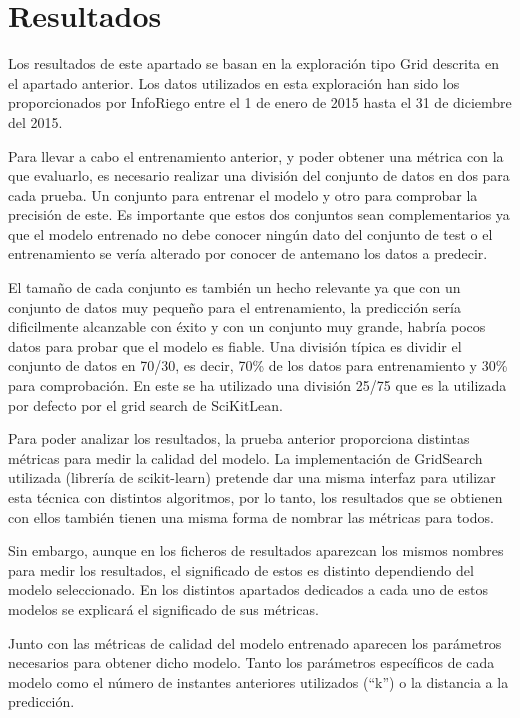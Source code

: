 \cleardoublepage

\chapter{Resultados}
\label{makereference7}

Los resultados de este apartado se basan en la exploración tipo Grid descrita en el apartado anterior. Los datos utilizados en esta exploración han sido los proporcionados por InfoRiego entre el 1 de enero de 2015 hasta el 31 de diciembre del 2015.

Para llevar a cabo el entrenamiento anterior, y poder obtener una métrica con la que evaluarlo, es necesario realizar una división del conjunto de datos en dos para cada prueba. Un conjunto para entrenar el modelo y otro para comprobar la precisión de este. Es importante que estos dos conjuntos sean complementarios ya que el modelo entrenado no debe conocer ningún dato del conjunto de test o el entrenamiento se vería alterado por conocer de antemano los datos a predecir.

El tamaño de cada conjunto es también un hecho relevante ya que con un conjunto de datos muy pequeño para el entrenamiento, la predicción sería dificilmente alcanzable con éxito y con un conjunto muy grande, habría pocos datos para probar que el modelo es fiable. Una división típica es dividir el conjunto de datos en 70/30, es decir, 70\% de los datos para entrenamiento y 30\% para comprobación. En este se ha utilizado una división 25/75 que es la utilizada por defecto por el grid search de SciKitLean.

Para poder analizar los resultados, la prueba anterior proporciona distintas métricas para medir la calidad del modelo. La implementación de GridSearch utilizada (librería de scikit-learn) pretende dar una misma interfaz para utilizar esta técnica con distintos algoritmos, por lo tanto, los resultados que se obtienen con ellos también tienen una misma forma de nombrar las métricas para todos.

Sin embargo, aunque en los ficheros de resultados aparezcan los mismos nombres para medir los resultados, el significado de estos es distinto dependiendo del modelo seleccionado. En los distintos apartados dedicados a cada uno de estos modelos se explicará el significado de sus métricas.

Junto con las métricas de calidad del modelo entrenado aparecen los parámetros necesarios para obtener dicho modelo. Tanto los parámetros específicos de cada modelo como el número de instantes anteriores utilizados (``k'') o la distancia a la predicción.

